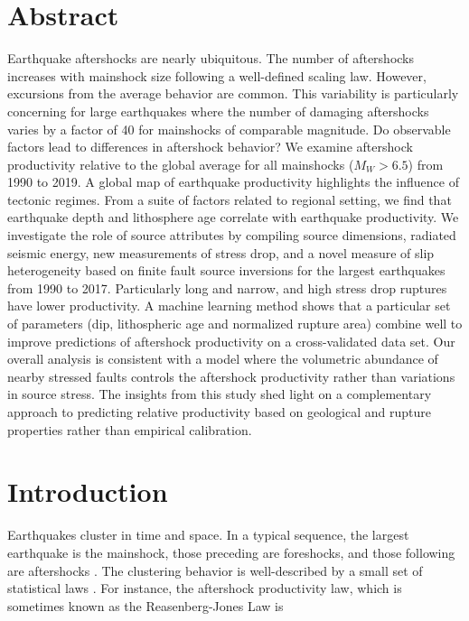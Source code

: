 \documentclass[draft]{agujournal2018}
\begin{document}
\newpage

\justify

\section*{Abstract}

Earthquake aftershocks are nearly ubiquitous. The number of aftershocks increases with mainshock size following a well-defined scaling law. However, excursions from the average behavior are common. This variability is particularly concerning for large earthquakes where the number of damaging aftershocks varies by a  factor of 40 for mainshocks of comparable magnitude. Do observable factors lead to differences in aftershock behavior? We examine aftershock productivity relative to the global average for all mainshocks ($M_W>6.5$) from 1990 to 2019. A global map of earthquake productivity highlights the influence of tectonic regimes. From a suite of factors related to regional setting, we find that earthquake depth and lithosphere age correlate with earthquake productivity. We investigate the role of source attributes by compiling source dimensions, radiated seismic energy, new measurements of stress drop, and a novel measure of slip heterogeneity based on finite fault source inversions for the largest earthquakes from 1990 to 2017. Particularly long and narrow, and high stress drop ruptures have lower productivity. A machine learning method shows that a particular set of parameters (dip, lithospheric age and normalized rupture area) combine well to improve predictions of aftershock productivity on a cross-validated data set. Our overall analysis is consistent with a model where the volumetric abundance of nearby stressed faults controls the aftershock productivity rather than variations in source stress. The insights from this study shed light on a complementary approach to predicting relative productivity based on geological and rupture properties rather than empirical calibration.  

\section{Introduction}

Earthquakes cluster in time and space. In a typical sequence, the largest earthquake is the mainshock, those preceding are foreshocks, and those following are aftershocks \citep{Omori1895}. The clustering behavior is well-described by a small set of statistical laws \citep[e.g.,][]{Ogata1988}. For instance, the aftershock productivity law, which is sometimes known as the Reasenberg-Jones Law is
\end{document}
